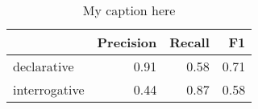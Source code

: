 \begin{table}[!ht]
\centering
\begin{tabular}{lrrr}
\toprule
{} &  Precision &  Recall &   F1 \\
\midrule
declarative   &       0.91 &    0.58 & 0.71 \\
interrogative &       0.44 &    0.87 & 0.58 \\
\bottomrule
\end{tabular}
\caption{My caption here}
\label{tab:INDICATIVE-ocd-combined-F1}
\end{table}
